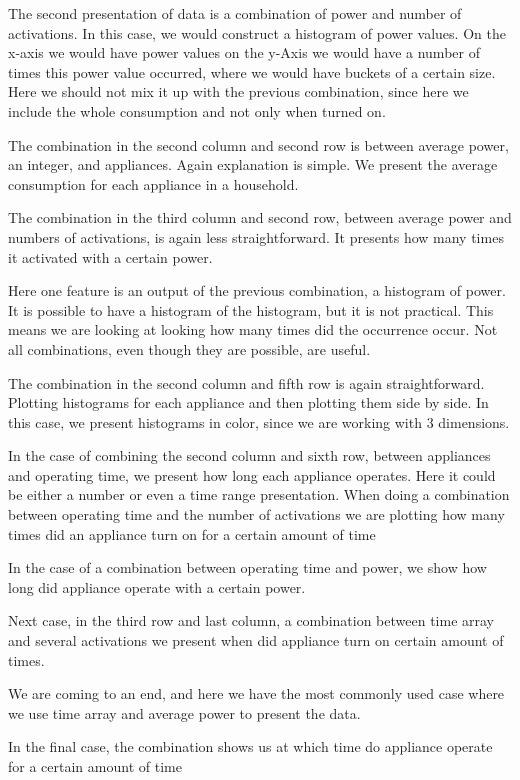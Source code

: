 The second presentation of data is a combination of power and number of activations. 
In this case, we would construct a histogram of power values. 
On the x-axis we would have power values on the y-Axis we would have a number of times this power value occurred, where we would have buckets of a certain size.
Here we should not mix it up with the previous combination, since here we include the whole consumption and not only when turned on. 

The combination in the second column and second row is between average power, an integer, and appliances. Again explanation is simple. We present the average consumption for each appliance in a household.

The combination in the third column and second row, between average power and numbers of activations, is again less straightforward.
It presents how many times it activated with a certain power.

Here one feature is an output of the previous combination, a histogram of power. 
It is possible to have a histogram of the histogram, but it is not practical. 
This means we are looking at looking how many times did the occurrence occur. 
Not all combinations, even though they are possible, are useful. 

The combination in the second column and fifth row is again straightforward. 
Plotting histograms for each appliance and then plotting them side by side.
In this case, we present histograms in color, since we are working with 3 dimensions.

In the case of combining the second column and sixth row, between appliances and operating time, we present how long each appliance operates.
Here it could be either a number or even a time range presentation.
When doing a combination between operating time and the number of activations we are plotting how many times did an appliance turn on for a certain amount of time

In the case of a combination between operating time and power, we show how long did appliance operate with a certain power.

Next case, in the third row and last column, a combination between time array and several activations we present when did appliance turn on certain amount of times. 

We are coming to an end, and here we have the most commonly used case where we use time array and average power to present the data.

In the final case, the combination shows us at which time do appliance operate for a certain amount of time 

